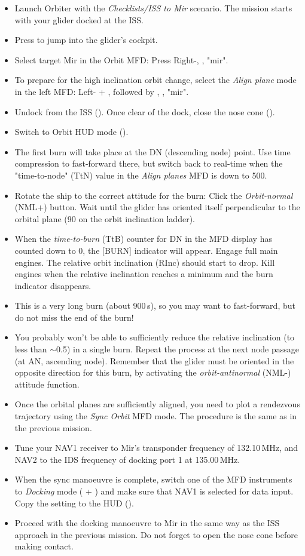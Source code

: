 \documentclass[Orbiter User Manual.tex]{subfiles}
\begin{document}
\begin{itemize}
	\item Launch Orbiter with the \emph{Checklists/ISS to Mir} scenario. The
		mission starts with your glider docked at the ISS.
	\item Press  to jump into the glider's cockpit.
	\item Select target Mir in the Orbit MFD: Press Right-, \Enter,
		"mir".
	\item To prepare for the high inclination orbit change, select the
		\emph{Align plane} mode in the left MFD: Left- + ,
		followed by , \Enter, "mir".
	\item Undock from the ISS (). Once clear of the dock,
		close the nose cone ().
	\item Switch to Orbit HUD mode ().
	\item The first burn will take place at the DN (descending node) point. Use
		time compression to fast-forward there, but switch back to real-time
		when the "time-to-node" (TtN) value in the \emph{Align planes} MFD is
		down to 500.
	\item Rotate the ship to the correct attitude for the burn: Click the
		\emph{Orbit-normal} (NML+) button. Wait until the glider has oriented
		itself perpendicular to the orbital plane (90\deg{} on the orbit
		inclination ladder).
	\item When the \emph{time-to-burn} (TtB) counter for DN in the MFD display
		has counted down to 0, the [BURN] indicator will appear. Engage full
		main engines. The relative orbit inclination (RInc) should start to
		drop. Kill engines when the relative inclination reaches a minimum and
		the burn indicator disappears.
	\item This is a very long burn (about 900\,s), so you may want to
		fast-forward, but do not miss the end of the burn!
	\item You probably won't be able to sufficiently reduce the relative
		inclination (to less than $\sim$0.5\deg{}) in a single burn. Repeat the
		process at the next node passage (at AN, ascending node). Remember that
		the glider must be oriented in the opposite direction for this burn, by
		activating the \emph{orbit-antinormal} (NML-) attitude function.
	\item Once the orbital planes are sufficiently aligned, you need to plot a
		rendezvous trajectory using the \emph{Sync Orbit} MFD mode. The
		procedure is the same as in the previous mission.
	\item Tune your NAV1 receiver to Mir's transponder frequency of 132.10\,MHz,
		and NAV2 to the IDS frequency of docking port 1 at 135.00\,MHz.
	\item When the sync manoeuvre is complete, switch one of the MFD instruments
		to \emph{Docking} mode ( + ) and make sure that
		NAV1 is selected for data input. Copy the setting to the HUD
		().
	\item Proceed with the docking manoeuvre to Mir in the same way as the ISS
		approach in the previous mission. Do not forget to open the nose cone
		before making contact.
\end{itemize}
\end{document}
